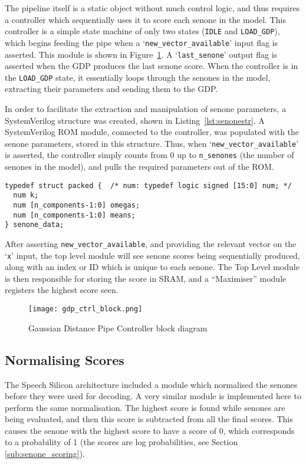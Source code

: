 		The pipeline itself is a static object without much control logic, and thus requires a controller which sequentially uses it to score each senone in the model.  This controller is a simple state machine of only two states (\texttt{IDLE} and \texttt{LOAD\_GDP}), which begins feeding the pipe when a `\texttt{new\_vector\_available}' input flag is asserted.  This module is shown in Figure~\ref{fig:gdp_ctrl_block}.  A `\texttt{last\_senone}' output flag is asserted when the GDP produces the last senone score.  When the controller is in the \texttt{LOAD\_GDP} state, it essentially loops through the senones in the model, extracting their parameters and sending them to the GDP.  

		In order to facilitate the extraction and manipulation of senone parameters, a SystemVerilog structure was created, shown in Listing~\ref{lst:senonestr}. A SystemVerilog ROM module, connected to the controller, was populated with the senone parameters, stored in this structure.  Thus, when `\texttt{new\_vector\_available}' is asserted, the controller simply counts from 0 up to \texttt{n\_senones} (the number of senones in the model), and pulls the required parameters out of the ROM.

\begin{lstlisting}[style=customc, label=lst:senonestr, caption=Senone parameter data structure]
typedef struct packed {  /* num: typedef logic signed [15:0] num; */
  num k;
  num [n_components-1:0] omegas;
  num [n_components-1:0] means;
} senone_data;
\end{lstlisting}

		After asserting \texttt{new\_vector\_available}, and providing the relevant vector on the `\texttt{x}' input, the top level module will see  senone scores being sequentially produced, along with an index or ID which is unique to each senone.  The Top Level module is then responsible for storing the score in SRAM, and a ``Maximiser'' module registers the highest score seen.
		\begin{figure}[tb]
			\begin{center}
				\texttt{[image: gdp\_ctrl\_block.png]}
			\end{center}
			\caption{Gaussian Distance Pipe Controller block diagram}
			\label{fig:gdp_ctrl_block}
		\end{figure}

	\subsection{Normalising Scores} %
	\label{sub:normaliser}
		The Speech Silicon architecture included a module which normalised the senones before they were used for decoding.  A very similar module is implemented here to perform the same normalisation.  The highest score is found while senones are being evaluated, and then this score is subtracted from all the final scores.  This causes the senone with the highest score to have a score of 0, which corresponds to a probability of 1 (the scores are log probabilities, see Section \ref{sub:senone_scoring}).

